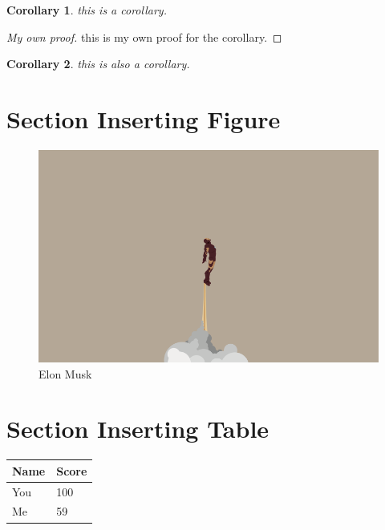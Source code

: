 \documentclass{article}
\newtheorem{corollary}{Corollary}[theorem]     %
\begin{document}
    \begin{corollary}
      this is a corollary.
    \end{corollary}

    \begin{proof}[My own proof]         %
      this is my own proof for the corollary.
    \end{proof}

    \begin{corollary}
      this is also a corollary.
    \end{corollary}


  
  
  \section{Section Inserting Figure}
  \begin{figure}[ht]
    \centering   %
    \includegraphics[width=1\textwidth, angle = 0]{3418998-simple-wallpapers}
    \caption{Elon Musk}
  \end{figure}

  \section{Section Inserting Table}
  \begin{tabular}{l|l}
    Name & Score \\
    \hline
    You & 100 \\
    Me & 59 \\
  \end{tabular}
\end{document}
